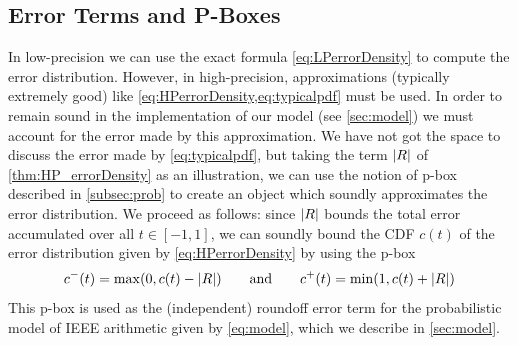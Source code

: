 \subsection{Error Terms and P-Boxes}\label{subsec:errorpbox}

In low-precision we can use the exact formula \cref{eq:LPerrorDensity} to compute the error distribution. However, in high-precision,  approximations (typically extremely good) like \cref{eq:HPerrorDensity,eq:typicalpdf} must be used. In order to remain sound in the implementation of our model (see \cref{sec:model}) we must account for the error made by this approximation. We have not got the space to discuss the error made by \cref{eq:typicalpdf}, but taking the term $\left\lvert R\right\rvert$ of \cref{thm:HP_errorDensity} as an illustration, we can use the notion of p-box described in \cref{subsec:prob} to create an object which soundly approximates the error distribution. We proceed as follows: since $\left\lvert R\right\rvert$ bounds the total error accumulated over all $t\in[-1,1]$, we can soundly bound the CDF $c(t)$ of the error distribution given by \cref{eq:HPerrorDensity} by using the p-box
\[
c^-(t)=\max(0,c(t)-\left\lvert R\right\rvert)\qquad\text{and} \qquad c^+(t)=\min(1,c(t)+\left\lvert R\right\rvert)
\]
This p-box is used as the (independent) roundoff error term for the probabilistic model of IEEE arithmetic given by \cref{eq:model}, which we describe in \cref{sec:model}.

